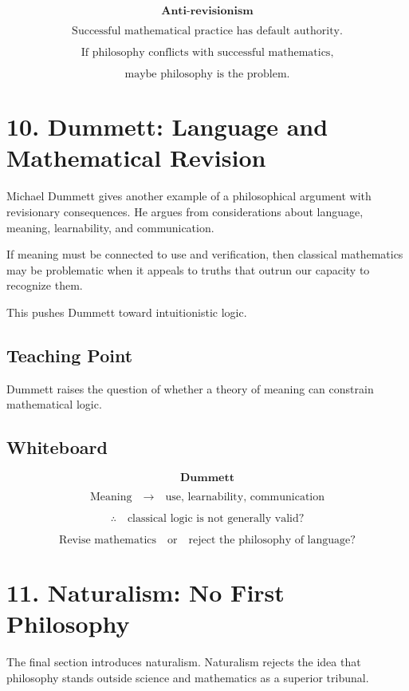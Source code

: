 \documentclass[11pt]{article}
\begin{document}
\[
\textbf{Anti-revisionism}
\]

\[
\text{Successful mathematical practice has default authority.}
\]

\[
\text{If philosophy conflicts with successful mathematics,}
\]

\[
\text{maybe philosophy is the problem.}
\]

\section*{10. Dummett: Language and Mathematical Revision}

Michael Dummett gives another example of a philosophical argument with revisionary
consequences. He argues from considerations about language, meaning, learnability, and
communication.

If meaning must be connected to use and verification, then classical mathematics may be
problematic when it appeals to truths that outrun our capacity to recognize them.

This pushes Dummett toward intuitionistic logic.

\subsection*{Teaching Point}

Dummett raises the question of whether a theory of meaning can constrain mathematical
logic.

\subsection*{Whiteboard}

\[
\textbf{Dummett}
\]

\[
\text{Meaning}
\quad \longrightarrow \quad
\text{use, learnability, communication}
\]

\[
\therefore \quad
\text{classical logic is not generally valid?}
\]

\[
\text{Revise mathematics}
\quad \text{or}
\quad
\text{reject the philosophy of language?}
\]

\section*{11. Naturalism: No First Philosophy}

The final section introduces naturalism. Naturalism rejects the idea that philosophy stands
outside science and mathematics as a superior tribunal.
\end{document}
